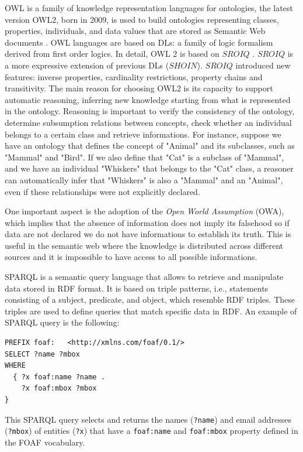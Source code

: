 OWL is a family of knowledge representation languages for ontologies, the latest version OWL2, born in 2009, is used to build ontologies representing classes, properties, individuals, and data values that are stored as Semantic Web documents \cite{owl2}. 
OWL languages are based on DLs: a family of logic formalism derived from first order logics. 
In detail, OWL 2 is based on $SROIQ$ \cite{sroiq}. 
$SROIQ$ is a more expressive extension of previous DLs ($SHOIN$). 
$SROIQ$ introduced new features: inverse properties, cardinality restrictions, property chains and transitivity.
The main reason for choosing OWL2 is its capacity to support automatic reasoning, inferring new knowledge starting from what is represented in the ontology.
Reasoning is important to verify the consistency of the ontology, determine subsumption relations between concepts, check whether an individual belongs to a certain class and retrieve informations.
For instance, suppose we have an ontology that defines the concept of "Animal" and its subclasses, such as "Mammal" and "Bird". If we also define that "Cat" is a subclass of "Mammal", and we have an individual "Whiskers" that belongs to the "Cat" class, a reasoner can automatically infer that "Whiskers" is also a "Mammal" and an "Animal", even if these relationships were not explicitly declared.

One important aspect is the adoption of the \textit{Open World Assumption} (OWA), which implies that the absence of information does not imply its falsehood so if data are not declared we do not have informations to establish its truth.
This is useful in the semantic web where the knowledge is distributed across different sources and it is impossible to have access to all possible informations.

SPARQL is a semantic query language that allows to retrieve and manipulate data stored in RDF format.
It is based on triple patterns, i.e., statements consisting of a subject, predicate, and object, which resemble RDF triples. These triples are used to define queries that match specific data in RDF.
An example of SPARQL query is the following:
\begin{lstlisting}
PREFIX foaf:   <http://xmlns.com/foaf/0.1/>
SELECT ?name ?mbox
WHERE
  { ?x foaf:name ?name .
    ?x foaf:mbox ?mbox 
}    
\end{lstlisting}
This SPARQL query selects and returns the names (\texttt{?name}) and email addresses (\texttt{?mbox}) of entities (\texttt{?x}) that have a \texttt{foaf:name} and \texttt{foaf:mbox} property defined in the FOAF vocabulary. 

